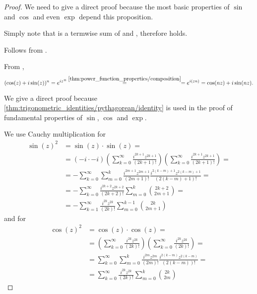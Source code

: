 \begin{proof}
  We need to give a direct proof because the most basic properties of \( \sin \) and \( \cos \) and even \( \exp \) depend this proposition.

   Simply note that  is a termwise sum of  and , therefore  holds.

   Follows from .

   From ,
  \begin{equation*}
    (\cos(z) + i \sin(z))^n
    =
    {e^{iz}}^n
    \overset {\ref{thm:power_function_properties/composition}} {=}
    =
    e^{i(zn)}
    =
    \cos(nz) + i \sin(nz).
  \end{equation*}

   We give a direct proof because \eqref{thm:trigonometric_identities/pythagorean/identity} is used in the proof of fundamental properties of \( \sin \), \( \cos \) and \( \exp \).

  We use Cauchy multiplication for
  \begin{align*}
    \sin(z)^2
     & =
    \sin(z) \cdot \sin(z)
    =    \\ &=
    (-i \cdot -i) \left( \sum_{k=0}^\infty \frac {i^{2k+1} z^{2k+1}} {(2k+1)!} \right) \left( \sum_{k=0}^\infty \frac {i^{2k+1} z^{2k+1}} {(2k+1)!} \right)
    =    \\ &=
    -\sum_{k=0}^\infty \sum_{m=0}^k \frac {i^{2m+1} z^{2m+1}} {(2m+1)!} \frac {i^{2(k-m)+1} z^{2(k-m)+1}} {(2(k-m)+1)!}
    =    \\ &=
    -\sum_{k=0}^\infty \frac {i^{2k+2} z^{2k+2}} {(2k+2)!} \sum_{m=0}^k \binom {2k+2} {2m+1}
    =    \\ &=
    -\sum_{k=1}^\infty \frac {i^{2k} z^{2k}} {(2k)!} \sum_{m=0}^{k-1} \binom {2k} {2m+1}
  \end{align*}
  and for
  \begin{align*}
    \cos(z)^2
     & =
    \cos(z) \cdot \cos(z)
    =    \\ &=
    \left( \sum_{k=0}^\infty \frac {i^{2k} z^{2k}} {(2k)!} \right) \left( \sum_{k=0}^\infty \frac {i^{2k} z^{2k}} {(2k)!} \right)
    =    \\ &=
    \sum_{k=0}^\infty \sum_{m=0}^k \frac {i^{2m} z^{2m}} {(2m)!} \frac {i^{2(k-m)} z^{2(k-m)}} {(2(k-m))!}
    =    \\ &=
    \sum_{k=0}^\infty \frac {i^{2k} z^{2k}} {(2k)!} \sum_{m=0}^k \binom {2k} {2m}
  \end{align*}


\end{proof}
